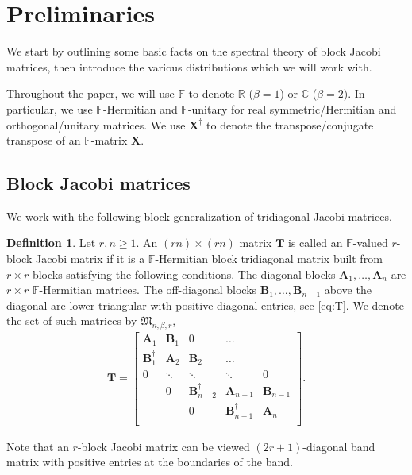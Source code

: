 \documentclass[pdftex]{sigma}
\numberwithin{equation}{section}
\theoremstyle{definition}
\newtheorem{Definition}[Theorem]{Definition}
\newcommand{\FF}{{\mathbb{F}}}
\newcommand{\R}{{\mathbb R}}
\newcommand{\CC}{{\mathbb C}}
\newcommand{\T}{\dag}
\newcommand{\mbf}[1]{\mathbf{#1}}
\begin{document}
\section{Preliminaries}\label{sec2}

We start by outlining some basic facts on the spectral theory of block Jacobi matrices, then introduce the various distributions which we will work with.

Throughout the paper, we will use $\FF$ to denote $\R$ ($\beta=1$) or $\CC$ ($\beta=2$). In particular, we use $\FF$-Hermitian and $\FF$-unitary for real symmetric/Hermitian and orthogonal/unitary matrices. We use $\mbf{X}^\T$ to denote the transpose/conjugate transpose of an $\FF$-matrix $\mbf{X}$.

\subsection{Block Jacobi matrices}

We work with the following block generalization of tridiagonal Jacobi matrices.

\begin{Definition}\label{def:tridiag}
 Let $r, n\ge 1$. An $(rn)\times(rn)$ matrix $\mbf{T}$ is called an $\FF$-valued $r$-block Jacobi matrix if it is a $\FF$-Hermitian block tridiagonal matrix built from $r\times r$ blocks satisfying the following conditions. The diagonal blocks $\mbf{A}_1, \dots, \mbf{A}_n$ are $r\times r$ $\FF$-Hermitian matrices. The off-diagonal blocks $\mbf{B}_1, \dots, \mbf{B}_{n-1}$ above the diagonal are lower triangular with positive diagonal entries, see \eqref{eq:T}.
 We denote the set of such matrices by $\mathfrak{M}_{n,\beta, r}$,
 \begin{align}\label{eq:T}
 \mbf{T}=
 \left[\begin{array}{ccccc}
 \mbf{A}_1& \mbf{B}_1 & 0 &\dots & \\
 \mbf{B}_1^{\dag} & \mbf{A}_2 &\mbf{B}_2 &\dots \\
 0&\ddots & \ddots & \ddots &0 \\
 & 0 & \mbf{B}_{n-2}^\dag &\mbf{A}_{n-1} &\mbf{B}_{n-1} \\
 & & 0 & \mbf{B}_{n-1}^\dag & \mbf{A}_n\\
 \end{array} \right].
 \end{align}
 \end{Definition}
Note that an $r$-block Jacobi matrix can be viewed $(2r+1)$-diagonal band matrix with positive entries at the boundaries of the band.
\end{document}
